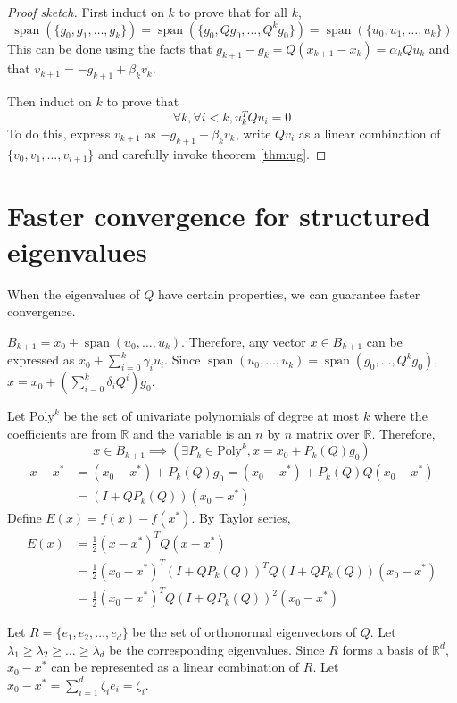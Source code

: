\begin{proof}[Proof sketch]
First induct on $k$ to prove that for all $k$,
\[ \operatorname{span}(\{g_0, g_1, \ldots, g_k\})
= \operatorname{span}(\{g_0, Qg_0, \ldots, Q^kg_0\})
= \operatorname{span}(\{u_0, u_1, \ldots, u_k\}) \]
This can be done using the facts that $g_{k+1} - g_k = Q(x_{k+1} - x_k) = \alpha_kQu_k$
and that $v_{k+1} = -g_{k+1} + \beta_k v_k$.

Then induct on $k$ to prove that
\[ \forall k, \forall i < k, u_k^TQu_i = 0 \]
To do this, express $v_{k+1}$ as $-g_{k+1} + \beta_k v_k$,
write $Qv_i$ as a linear combination of $\{v_0, v_1, \ldots, v_{i+1}\}$
and carefully invoke theorem \ref{thm:ug}.
\end{proof}

\section{Faster convergence for structured eigenvalues}

\newcommand*{\MatPoly}[1]{\textrm{Poly}^{#1}}

When the eigenvalues of $Q$ have certain properties,
we can guarantee faster convergence.

$B_{k+1} = x_0 + \operatorname{span}(u_0, \ldots, u_k)$.
Therefore, any vector $x \in B_{k+1}$ can be expressed as $x_0 + \sum_{i=0}^k \gamma_i u_i$.
Since $\operatorname{span}(u_0, \ldots, u_k) = \operatorname{span}(g_0, \ldots, Q^kg_0)$,
$x = x_0 + \left(\sum_{i=0}^k \delta_i Q^i\right)g_0$.

Let $\MatPoly{k}$ be the set of univariate polynomials of degree at most $k$
where the coefficients are from $\mathbb{R}$ and the variable is
an $n$ by $n$ matrix over $\mathbb{R}$. Therefore,
\[ x \in B_{k+1} \implies \left( \exists P_k \in \MatPoly{k}, x = x_0 + P_k(Q)g_0 \right) \]
\begin{align*}
x - x^* &= (x_0 - x^*) + P_k(Q)g_0
= (x_0 - x^*) + P_k(Q)Q(x_0 - x^*)
\\ &= (I + QP_k(Q))(x_0 - x^*)
\end{align*}
Define $E(x) = f(x) - f(x^*)$.
By Taylor series,
\begin{align*}
E(x) &= \frac{1}{2} (x-x^*)^TQ(x-x^*)
\\ &= \frac{1}{2} (x_0 - x^*)^T(I + QP_k(Q))^TQ(I+QP_k(Q))(x_0 - x^*)
\\ &= \frac{1}{2} (x_0 - x^*)^T Q(I + QP_k(Q))^2 (x_0 - x^*)
\end{align*}

Let $R = \{e_1, e_2, \ldots, e_d\}$ be the set of orthonormal eigenvectors of $Q$.
Let $\lambda_1 \ge \lambda_2 \ge \ldots \ge \lambda_d$ be the corresponding eigenvalues.
Since $R$ forms a basis of $\mathbb{R}^d$, $x_0 - x^*$ can be represented as a linear combination of $R$.
Let $x_0 - x^* = \sum_{i=1}^d \zeta_i e_i = \zeta_i$.

